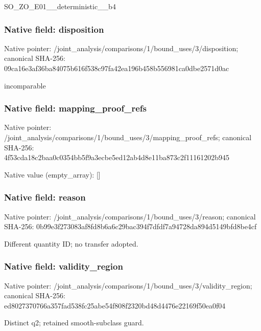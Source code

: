 \documentclass[10pt,a4paper]{article}
\begin{document}
\begingroup\raggedright\sloppy SO\_\allowbreak{}ZO\_\allowbreak{}E01\_\allowbreak{}\_\allowbreak{}deterministic\_\allowbreak{}\_\allowbreak{}b4\par\endgroup

\subsubsection{Native field: disposition}
Native pointer: /joint\_\allowbreak{}analysis/comparisons/1/bound\_\allowbreak{}uses/3/disposition; canonical SHA-256: 09ca16e3af36ba84075b616f538c97fa42ea196b458b556981ca0dbe2571d0ac

\begingroup\raggedright\sloppy incomparable\par\endgroup

\subsubsection{Native field: mapping\_\allowbreak{}proof\_\allowbreak{}refs}
Native pointer: /joint\_\allowbreak{}analysis/comparisons/1/bound\_\allowbreak{}uses/3/mapping\_\allowbreak{}proof\_\allowbreak{}refs; canonical SHA-256: 4f53cda18c2baa0c0354bb5f9a3ecbe5ed12ab4d8e11ba873c2f11161202b945

Native value (empty\_\allowbreak{}array): []

\subsubsection{Native field: reason}
Native pointer: /joint\_\allowbreak{}analysis/comparisons/1/bound\_\allowbreak{}uses/3/reason; canonical SHA-256: 0b99e3f273083af8fd8b6a6c29bac394f7dfdf7a94728da894d5149bfd8be4cf

\begingroup\raggedright\sloppy Different quantity ID;\allowbreak{} no transfer adopted.\par\endgroup

\subsubsection{Native field: validity\_\allowbreak{}region}
Native pointer: /joint\_\allowbreak{}analysis/comparisons/1/bound\_\allowbreak{}uses/3/validity\_\allowbreak{}region; canonical SHA-256: ed8027370766a357fad538fc25abe54f808f2320bd48d4476e22169f50ea0f04

\begingroup\raggedright\sloppy Distinct q2;\allowbreak{} retained smooth-subclass guard.\par\endgroup
\end{document}
